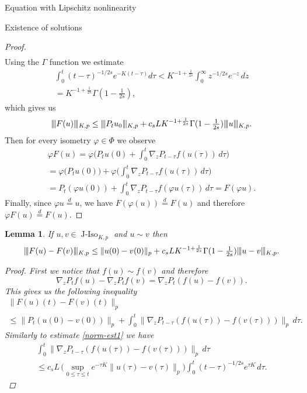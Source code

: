\documentclass[a4paper,10pt,fleqn]{amsart}
\newtheorem{lemma}[theorem]{Lemma}
\theoremstyle{remark}
\theoremstyle{definition}
\DeclareMathOperator{\JIso}{J-Iso}
\newcommand{\grad} {\nabla_{\!z}}
\renewcommand{\phi} {\varphi}
\renewcommand{\=} {\overset{d}{=}}
\newcommand{\viii} {|\kern-0.25ex|\kern-0.25ex|}
\newcommand{\K}[2] {\viii #1 \viii_{K,#2}}
\begin{document}
\begin{section}{Equation with Lipschitz nonlinearity}
\begin{subsection}{Existence of solutions}
\begin{proof}
\begin{multline}
    \end{multline}
    Using the $\Gamma$ function we estimate
    \begin{multline}\label{gamma}
     \int_0^{t} (t-\tau)^{-1/2s} e^{-K(t-\tau)}d\tau < K^{-1+\frac{1}{2s}}\int_0^{\infty} z^{-1/2s}e^{-z}\,dz \\= K^{-1+\frac{1}{2s}}\Gamma(1-\tfrac{1}{2s}),
    \end{multline}
    which gives us
    \begin{align*}
     \K{F(u)}{p} \leq \K{P_tu_0}{p} + c_sL K^{-1+\frac{1}{2s}}\Gamma(1-\tfrac{1}{2s}) \K{u}{p}.
    \end{align*}
   Then for every isometry $\phi\in\Phi$ we observe
   \begin{multline*}
    \phi F(u) = \phi\Big(P_t u(0) + \int_0^t\grad P_{t-\tau}f(u(\tau))\,d\tau\Big) \\
    =\phi\big(P_t u(0)\big) + \phi\Big(\int_0^t\grad P_{t-\tau}f(u(\tau))\,d\tau\Big) \\
    = P_t (\phi u(0)) + \int_0^t\grad P_{t-\tau}f(\phi u(\tau))\,d\tau = F(\phi u).
   \end{multline*}
   Finally, since $\phi u \= u$, we have $F(\phi(u)) \= F(u)$ and therefore $\phi F(u) \= F(u)$.
  \end{proof}
  \begin{lemma}\label{contraction}
    If $u,v\in\JIso_{K,p}$ and $u\sim v$ then
    \begin{equation*}
        \K{F(u)-F(v)}{p} \leq \|u(0)-v(0)\|_p + c_sLK^{-1+\frac{1}{2s}}\Gamma(1-\tfrac{1}{2s})\K{u-v}{p}.
    \end{equation*}
  \begin{proof}
    First we notice that $f(u)\sim f(v)$ and therefore
    \begin{equation*}
     \grad P_t f(u) - \grad P_tf(v) = \grad P_t (f(u)-f(v)).
    \end{equation*}
    This gives us the following inequality
     \begin{multline*}
      \|F(u)(t)-F(v)(t)\|_p 
      \\\leq \|P_t(u(0)-v(0))\|_p +\int_0^{t}\big\|\grad P_{t-\tau} (f(u(\tau))-f(v(\tau)))\big\|_p\,d\tau.
      \end{multline*}
      Similarly to estimate \eqref{norm-est1} we have
      \begin{multline*}
      \int_0^{t}\big\|\grad P_{t-\tau} (f(u(\tau))-f(v(\tau)))\big\|_p\,d\tau\\
      \leq c_sL\,\Big(\sup_{0\leq\tau\leq t}e^{-\tau K}\|u(\tau)-v(\tau)\|_p\Big)\int_0^{t} (t-\tau)^{-1/2s}e^{\tau K}\,d\tau.

\end{multline*}
\end{proof}
\end{lemma}
\end{subsection}
\end{section}
\end{document}
